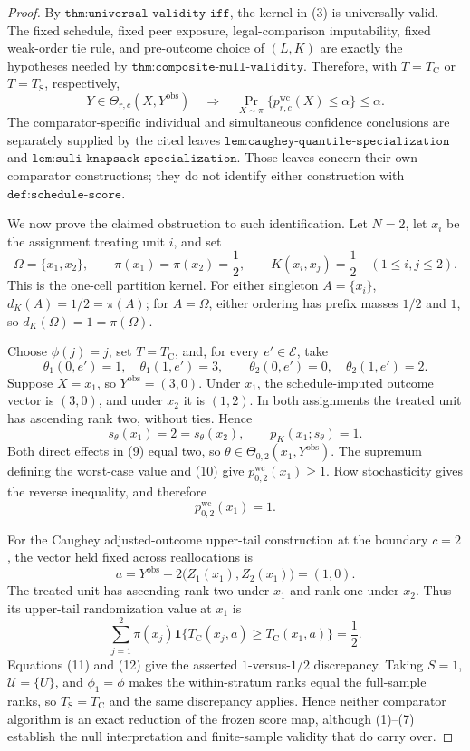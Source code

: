 \documentclass{article}
\begin{document}
\begin{proof}
By \(\texttt{thm:universal-validity-iff}\), the kernel in (3) is universally valid.  The fixed schedule, fixed peer exposure, legal-comparison imputability, fixed weak-order tie rule, and pre-outcome choice of \((L,K)\) are exactly the hypotheses needed by \(\texttt{thm:composite-null-validity}\).  Therefore, with \(T=T_{\mathrm C}\) or \(T=T_{\mathrm S}\), respectively,
\[
 Y\in\Theta_{r,c}(X,Y^{\mathrm{obs}})
 \quad\Longrightarrow\quad
 \Pr_{X\sim\pi}\{p^{\mathrm{wc}}_{r,c}(X)\leq\alpha\}
 \leq\alpha.
\tag{7}
\]
The comparator-specific individual and simultaneous confidence conclusions are separately supplied by the cited leaves \(\texttt{lem:caughey-quantile-specialization}\) and \(\texttt{lem:suli-knapsack-specialization}\).  Those leaves concern their own comparator constructions; they do not identify either construction with \(\texttt{def:schedule-score}\).

We now prove the claimed obstruction to such identification.  Let \(N=2\), let \(x_i\) be the assignment treating unit \(i\), and set
\[
 \Omega=\{x_1,x_2\},\qquad
 \pi(x_1)=\pi(x_2)=\frac12,
 \qquad K(x_i,x_j)=\frac12\quad(1\leq i,j\leq2).
\tag{8}
\]
This is the one-cell partition kernel.  For either singleton \(A=\{x_i\}\), \(d_K(A)=1/2=\pi(A)\); for \(A=\Omega\), either ordering has prefix masses \(1/2\) and \(1\), so \(d_K(\Omega)=1=\pi(\Omega)\).

Choose \(\phi(j)=j\), set \(T=T_{\mathrm C}\), and, for every \(e'\in\mathcal E\), take
\[
 \theta_1(0,e')=1,\quad \theta_1(1,e')=3,
 \qquad
 \theta_2(0,e')=0,\quad \theta_2(1,e')=2.
\tag{9}
\]
Suppose \(X=x_1\), so \(Y^{\mathrm{obs}}=(3,0)\).  Under \(x_1\), the schedule-imputed outcome vector is \((3,0)\), and under \(x_2\) it is \((1,2)\).  In both assignments the treated unit has ascending rank two, without ties.  Hence
\[
 s_\theta(x_1)=2=s_\theta(x_2),
 \qquad p_K(x_1;s_\theta)=1.
\tag{10}
\]
Both direct effects in (9) equal two, so \(\theta\in\Theta_{0,2}(x_1,Y^{\mathrm{obs}})\).  The supremum defining the worst-case value and (10) give \(p^{\mathrm{wc}}_{0,2}(x_1)\geq1\).  Row stochasticity gives the reverse inequality, and therefore
\[
 p^{\mathrm{wc}}_{0,2}(x_1)=1.
\tag{11}
\]

For the Caughey adjusted-outcome upper-tail construction at the boundary \(c=2\), the vector held fixed across reallocations is
\[
 a=Y^{\mathrm{obs}}-2\bigl(Z_1(x_1),Z_2(x_1)\bigr)=(1,0).
\]
The treated unit has ascending rank two under \(x_1\) and rank one under \(x_2\).  Thus its upper-tail randomization value at \(x_1\) is
\[
 \sum_{j=1}^{2}\pi(x_j)
 \mathbf 1\{T_{\mathrm C}(x_j,a)\geq T_{\mathrm C}(x_1,a)\}
 =\frac12.
\tag{12}
\]
Equations (11) and (12) give the asserted \(1\)-versus-\(1/2\) discrepancy.  Taking \(S=1\), \(\mathcal U=\{U\}\), and \(\phi_1=\phi\) makes the within-stratum ranks equal the full-sample ranks, so \(T_{\mathrm S}=T_{\mathrm C}\) and the same discrepancy applies.  Hence neither comparator algorithm is an exact reduction of the frozen score map, although (1)--(7) establish the null interpretation and finite-sample validity that do carry over.
\end{proof}
\end{document}
